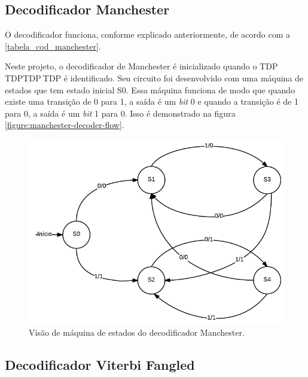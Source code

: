 	\subsection{Decodificador Manchester}
	
	O decodificador funciona, conforme explicado anteriormente, de acordo com a \autoref{tabela_cod_manchester}.
	
	Neste projeto, o decodificador de Manchester é inicializado quando o TDP$~$TDPTDP$~$TDP é identificado. Seu circuito foi desenvolvido com uma máquina de estados que tem estado inicial S0. Essa máquina funciona de modo que quando existe uma transição de 0 para 1, a saída é um \textit{bit} 0 e quando a transição é de 1 para 0, a saída é um \textit{bit} 1 para 0. Isso é demonstrado na figura \autoref{figure:manchester-decoder-flow}. 
		
	\begin{figure}[h]
		\caption{\label{figure:manchester-decoder-flow}Visão de máquina de estados do decodificador Manchester.}
		\centering
		\includegraphics[width=0.4\textheight]{manchester/decoder-flow.pdf}
	\end{figure}
	
	
	\subsection{Decodificador Viterbi Fangled}
	
